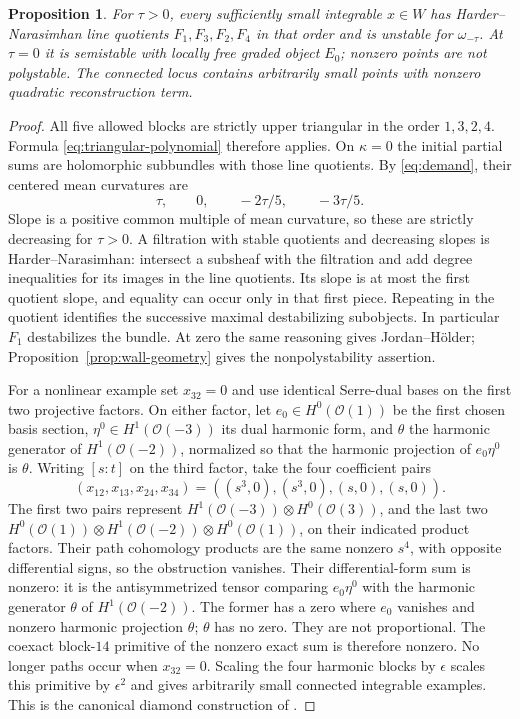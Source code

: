 \documentclass[11pt]{amsart}
\newtheorem{proposition}[theorem]{Proposition}
\theoremstyle{definition}
\theoremstyle{remark}
\newcommand{\cO}{\mathcal O}
\begin{document}
\begin{proposition}\label{prop:hn-filtration}
For $\tau>0$, every sufficiently small integrable $x\in W$
has Harder--Narasimhan line quotients $F_1,F_3,F_2,F_4$ in
that order and is unstable for $\omega_{-\tau}$.
At $\tau=0$ it is semistable with locally free graded object
$E_0$; nonzero points are not polystable. The connected locus
contains arbitrarily small points with nonzero quadratic
reconstruction term.
\end{proposition}
\begin{proof}
All five allowed blocks are strictly upper triangular in the
order $1,3,2,4$. Formula \eqref{eq:triangular-polynomial}
therefore applies. On $\kappa=0$ the initial partial sums
are holomorphic subbundles with those line quotients.
By \eqref{eq:demand}, their centered mean curvatures are
\begin{equation}\label{eq:hn-slopes}
 \tau,\qquad 0,\qquad-2\tau/5,\qquad-3\tau/5.
\end{equation}
Slope is a positive common multiple of mean curvature, so these
are strictly decreasing for $\tau>0$. A filtration with stable
quotients and decreasing slopes is Harder--Narasimhan: intersect
a subsheaf with the filtration and add degree inequalities for
its images in the line quotients. Its slope is at most the
first quotient slope, and equality can occur only in that
first piece. Repeating in the quotient identifies the successive
maximal destabilizing subobjects. In particular $F_1$
destabilizes the bundle. At zero the same reasoning gives
Jordan--H\"older; Proposition~\ref{prop:wall-geometry} gives
the nonpolystability assertion.

For a nonlinear example set $x_{32}=0$ and use identical
Serre-dual bases on the first two projective factors. On either
factor, let $e_0\in H^0(\cO(1))$ be the first chosen basis
section, $\eta^0\in H^1(\cO(-3))$ its dual harmonic form,
and $\theta$ the harmonic generator of $H^1(\cO(-2))$,
normalized so that the harmonic projection of $e_0\eta^0$
is $\theta$.
Writing $[s:t]$ on the third factor, take the four coefficient
pairs
\begin{equation}\label{eq:nonlinear-diamond}
 (x_{12},x_{13},x_{24},x_{34})
                 =((s^3,0),(s^3,0),(s,0),(s,0)).
\end{equation}
The first two pairs represent
$H^1(\cO(-3))\otimes H^0(\cO(3))$, and the last two
$H^0(\cO(1))\otimes H^1(\cO(-2))\otimes H^0(\cO(1))$,
on their indicated product factors. Their path cohomology
products are the same nonzero $s^4$, with opposite differential
signs, so the obstruction vanishes. Their differential-form
sum is nonzero: it is the antisymmetrized tensor comparing
$e_0\eta^0$ with the harmonic generator $\theta$ of
$H^1(\cO(-2))$. The former has a zero where $e_0$ vanishes
and nonzero harmonic projection $\theta$; $\theta$ has no
zero. They are not proportional. The coexact block-$14$
primitive of the nonzero exact sum is therefore nonzero.
No longer paths occur when $x_{32}=0$.
Scaling the four harmonic blocks by $\epsilon$ scales this
primitive by $\epsilon^2$ and gives arbitrarily small connected
integrable examples. This is the canonical diamond construction
of \cite[Section 6.4]{WuebbenThreeStep26}.
\end{proof}
\end{document}
